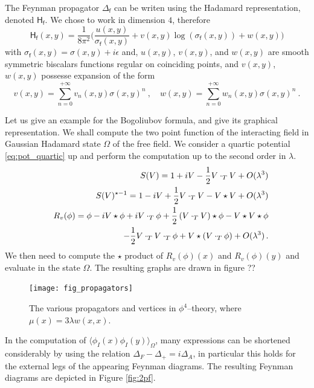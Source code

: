 \documentclass[12pt]{book}
\newcommand{\Hsf}{\mathsf{H}}
\newcommand{\fsf}{\mathsf{f}}
\theoremstyle{break}
\begin{document}


The Feynman propagator $\Delta_\fsf$ can be writen using the Hadamard representation, denoted $\Hsf_\fsf$. We chose to work in dimension $4$, therefore 
%
\begin{equation}
\Hsf_\fsf(x,y) = \frac{1}{8\pi^2} \bigg( \frac{u(x,y)}{\sigma_\fsf(x,y)} + v(x,y) \log\left( \sigma_\fsf(x,y) \right) + w(x,y) \bigg) 
\label{eq:hadamard_rep}
\end{equation}
%
with $\sigma_\fsf(x,y) = \sigma(x,y) + i \epsilon$ and, $u(x,y)$, $v(x,y)$, and $w(x,y)$ are smooth symmetric biscalars functions regular on coinciding points, and $v(x,y)$, $w(x,y)$ possesse expansion of the form
%
\begin{equation*}
v(x,y) = \sum_{n=0}^{+\infty} v_n(x,y) \sigma(x,y)^n \ , \quad 
w(x,y) = \sum_{n=0}^{+\infty} w_n(x,y) \sigma(x,y)^n \ .
\end{equation*}
% 


Let us give an example for the Bogoliubov formula, and give its graphical representation. We shall compute the two point function of the interacting field in Gaussian Hadamard state $\Omega$ of the free field. We consider a quartic potential \eqref{eq:pot_quartic} up and perform the computation up to the second order in $\lambda$. 
%
\begin{eqnarray*}
&& S(V)=1+iV-\frac12 V\cdot_T V + O(\lambda^3) \\
&& S(V)^{\star -1}=1-iV+\frac12 V\cdot_T V-V\star V + O(\lambda^3) \\
&& R_v(\phi)=\phi-i V\star \phi+i V\cdot_T\phi+\frac12\left( V\cdot_T V\right)\star \phi-V\star V\star\phi \\
&& \hspace*{50pt} - \frac12 V\cdot_T V\cdot_T \phi+V\star(V\cdot_T\phi)+O(\lambda^3)\,.
\end{eqnarray*}
%
We then need to compute the $\star$ product of $R_v(\phi)(x)$ and $R_v(\phi)(y)$ and evaluate in the state $\Omega$. The resulting graphs are drawn in figure ??%


\begin{figure}[!htb]
\begin{center}
\texttt{[image: fig\_propagators]}
\end{center}
\caption{The various propagators and vertices in $\phi^4$--theory, where $\mu(x)=3\lambda w(x,x)$.}
\label{fig:propagators}
\end{figure}

In the computation of $\langle\phi_I(x)\phi_I(y)\rangle_\Omega$, many expressions can be shortened considerably by using the relation $\Delta_F-\Delta_+=i\Delta_A$, in particular this holds for the external legs of the appearing Feynman diagrams. The resulting Feynman diagrams are depicted in Figure \ref{fig:2pf}.
\end{document}
